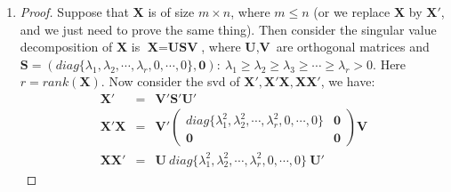 \documentclass[12pt]{article}
\newcommand{\ttt}[1]{\textbf{#1}}
\newcommand{\la}{\langle}
\newcommand{\ra}{\rangle}
\begin{document}
\begin{enumerate}
\begin{proof}
        Therefore, the second step is to find the argmin of:
        $$ ||\ttt{y} - \beta_2\ttt{x}_2 - \frac{\la \ttt{y} - \beta_2 \ttt{x}_2, \ttt{x}_1 \ra}{\la \ttt{x}_1, \ttt{x}_2 \ra} \ttt{x}_1||^2 = ||(\ttt{y} - \frac{\la \ttt{y}, \ttt{x}_1 \ra}{\la \ttt{x}_1, \ttt{x}_1 \ra}\ttt{x}_1) - \beta_2 (\ttt{x}_2 - \frac{\la \ttt{x}_2, \ttt{x}_1 \ra}{\la \ttt{x}_1, \ttt{x}_1 \ra} \ttt{x}_1)||^2$$
        Also, we can find that:
        \begin{eqnarray}
            \ttt{r}_1 &=& \ttt{y} - \frac{\la \ttt{y}, \ttt{x}_1 \ra}{\la \ttt{x}_1, \ttt{x}_1 \ra}\ttt{x}_1\\
            \ttt{r}_2 &=& \ttt{x}_2 - \frac{\la \ttt{x}_2, \ttt{x}_1 \ra}{\la \ttt{x}_1, \ttt{x}_1 \ra} \ttt{x}_1
        \end{eqnarray}
        Therefore, $\hat{\beta}_2$ comes from minimizing $||\ttt{r}_1 - \beta_2 \ttt{r}_2||^2$, which is just doing regression through origin of $\ttt{r}_1$ on $\ttt{r}_2$.
        Then we finish the proof that the procedure described in the question is valid.
    \end{proof}
    \item
    \begin{proof}
        Suppose that $\ttt{X}$ is of size $m \times n$, where $m \le n$ (or we replace $\ttt{X}$ by $\ttt{X}'$, and we just need to prove the same thing).
        Then consider the singular value decomposition of $\ttt{X}$ is $\ttt{X} = \ttt{U} \ttt{S} \ttt{V}$,
        where $\ttt{U},\ttt{V}$ are orthogonal matrices and $\ttt{S} = \left( diag\{\lambda_1,\lambda_2,\cdots,\lambda_r,0,\cdots,0\}, \ttt{0} \right): \  \lambda_1 \ge \lambda_2 \ge \lambda_3 \ge \cdots \ge \lambda_r > 0$.
        Here $r = rank(\ttt{X})$. Now consider the svd of $\ttt{X}', \ttt{X}'\ttt{X}, \ttt{X}\ttt{X}'$, we have:
        \begin{eqnarray}
            \ttt{X}' &=& \ttt{V}' \ttt{S}' \ttt{U}'\\
            \ttt{X}'\ttt{X} &=& \ttt{V}' \begin{pmatrix} 
                                            diag\{\lambda_1^2,\lambda_2^2,\cdots,\lambda_r^2,0,\cdots,0\} & \ttt{0} \\
                                            \ttt{0} & \ttt{0} 
                                         \end{pmatrix} \ttt{V} \\
            \ttt{X}\ttt{X}' &=& \ttt{U}\ diag\{\lambda_1^2,\lambda_2^2,\cdots,\lambda_r^2,0,\cdots,0\}\ \ttt{U}'
        \end{eqnarray}

\end{proof}
\end{enumerate}
\end{document}
